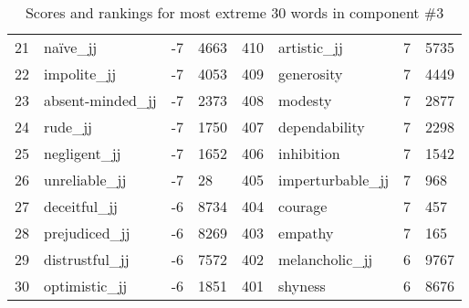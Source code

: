\begin{table}[tbp]
\begin{tabular}{| rlr@{.}l | rlr@{.}l |}
    21 & naïve\_jj & -7 & 4663    &    410 & artistic\_jj & 7 & 5735 \\
    22 & impolite\_jj & -7 & 4053    &    409 & generosity & 7 & 4449 \\
    23 & absent-minded\_jj & -7 & 2373    &    408 & modesty & 7 & 2877 \\
    24 & rude\_jj & -7 & 1750    &    407 & dependability & 7 & 2298 \\
    25 & negligent\_jj & -7 & 1652    &    406 & inhibition & 7 & 1542 \\
    26 & unreliable\_jj & -7 & 28    &    405 & imperturbable\_jj & 7 & 968 \\
    27 & deceitful\_jj & -6 & 8734    &    404 & courage & 7 & 457 \\
    28 & prejudiced\_jj & -6 & 8269    &    403 & empathy & 7 & 165 \\
    29 & distrustful\_jj & -6 & 7572    &    402 & melancholic\_jj & 6 & 9767 \\
    30 & optimistic\_jj & -6 & 1851    &    401 & shyness & 6 & 8676 \\
    \hline
    \end{tabular}
    \caption{Scores and rankings for most extreme 30 words in component \#3} 
\end{table}
\clearpage
